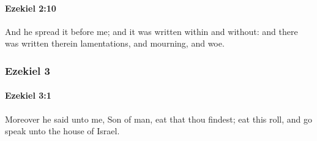 		\paragraph{Ezekiel 2:10} %
			\label{EZEKIEL-2-10}

			And he spread it before me; and it was written within and without: and there was written therein lamentations, and mourning, and woe.

	\subsubsection{Ezekiel 3} %
		\label{EZEKIEL-3}

		\paragraph{Ezekiel 3:1} %
			\label{EZEKIEL-3-1}

			Moreover he said unto me, Son of man, eat that thou findest; eat this roll, and go speak unto the house of Israel.

